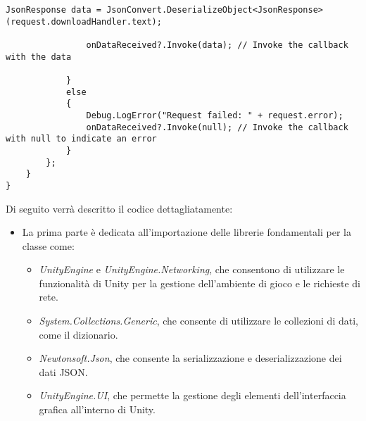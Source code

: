 \begin{lstlisting}[caption=Codice sorgente dello script \textit{MongoDBConnector}, label=lst:MongoDBConnectorScript, captionpos=b, basicstyle=\scriptsize]
                JsonResponse data = JsonConvert.DeserializeObject<JsonResponse>(request.downloadHandler.text);
                
                onDataReceived?.Invoke(data); // Invoke the callback with the data
                
            }
            else
            {
                Debug.LogError("Request failed: " + request.error);
                onDataReceived?.Invoke(null); // Invoke the callback with null to indicate an error
            }
        };
    }
}

\end{lstlisting}


Di seguito verrà descritto il codice dettagliatamente:

\begin{itemize}
	\item La prima parte è dedicata all'importazione delle librerie fondamentali per la classe come:
	\begin{itemize}
		\item \textit{UnityEngine} e \textit{UnityEngine.Networking}, che consentono di utilizzare le funzionalità di Unity per la gestione dell'ambiente di gioco e le richieste di rete.
		\item \textit{System.Collections.Generic}, che consente di utilizzare le collezioni di dati, come il dizionario.
		\item \textit{Newtonsoft.Json}, che consente la serializzazione e deserializzazione dei dati JSON.
		\item \textit{UnityEngine.UI}, che permette la gestione degli elementi dell'interfaccia grafica all'interno di Unity.
	\end{itemize}
	

\end{itemize}
